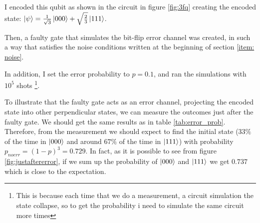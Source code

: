 I encoded this qubit as shown in the circuit in figure \ref{fig:3fq} creating the encoded state: $\ket{\psi}=\frac{1}{\sqrt{3}}\ket{000} + \sqrt{\frac{2}{3}} \ket{111}$. 

Then, a faulty gate that simulates the bit-flip error channel was created, in such a way that satisfies the noise conditions written at the beginning of section \ref{item: noise}.

In addition, I set the error probability to $p=0.1$, and ran the simulations with $10^5$ shots \footnote{This is because each time that we do a measurement, a circuit simulation the state collapse, so to get the probability i need to simulate the same circuit more times}.

To illustrate that the faulty gate acts as an error channel, projecting the encoded state into other perpendicular states, we can measure the outcomes just after the faulty gate. We should get the same results as in table \ref{tab:error_prob}. Therefore, from the measurement we should expect to find the initial state ($33\%$ of the time in $\ket{000}$ and around $67\%$ of the time in $\ket{111}$) with probability $p_{no  err}=(1-p)^3=0.729$. In fact, as it is possible to see from figure \ref{fig:justaftererror}, if we sum up the probability of $\ket{000}$ and $\ket{111}$ we get $0.737$ which is close to the expectation.


